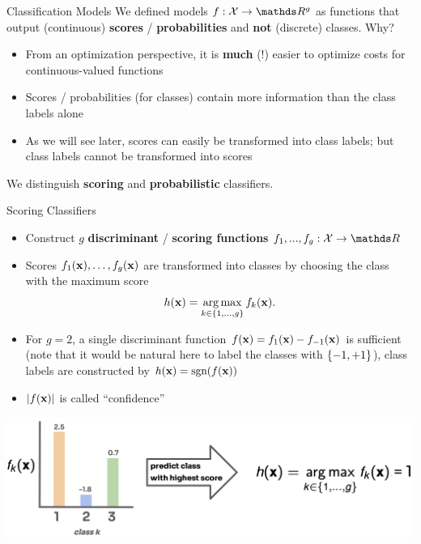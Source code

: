 \documentclass[11pt,compress,t,notes=noshow, xcolor=table]{beamer}
\begin{document}
\begin{vbframe}{Classification Models} 
We defined models $f: \Xspace \to \R^g$ as functions that output (continuous) \textbf{scores} / \textbf{probabilities} and \textbf{not} (discrete) classes. Why? 

\begin{itemize}
  \item From an optimization perspective, it is \textbf{much} (!) easier to optimize costs for continuous-valued functions 
  \item Scores / probabilities (for classes) contain more information than the class labels alone
  \item As we will see later, scores can easily be transformed into class labels; but class labels cannot be transformed into scores
\end{itemize}

We distinguish \textbf{scoring} and \textbf{probabilistic} classifiers.
\end{vbframe}


\begin{vbframe}{Scoring Classifiers}
\begin{itemize}
\item Construct $g$ \textbf{discriminant} / \textbf{scoring functions} $f_1, ..., f_g: \Xspace \to \R$
\item Scores $f_1(\xv), \ldots, \fkx[g]$ are transformed into classes by choosing the class with the maximum score 
$$
h(\xv) = \argmax_{k \in \gset} \fkx[k]. 
$$ 

\item For $g = 2$, a single discriminant function $\fx = f_{1}(\xv) - f_{-1}(\xv)$ is sufficient (note that it would be natural here to label the classes with $\setmp$), class labels are constructed by $\hx = \text{sgn}(\fx)$
\item $|\fx|$ is called \enquote{confidence}
\end{itemize}

\vspace{-0.3cm}

\begin{center}
  \includegraphics{figure_man/scores.png} 
\end{center}
 
\end{vbframe}
\end{document}
